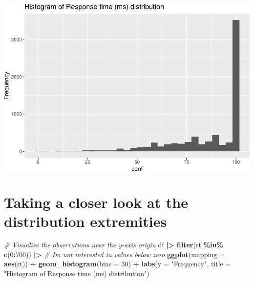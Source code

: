 \documentclass[
]{article}
\newenvironment{Shaded}{\begin{snugshade}}{\end{snugshade}}
\newcommand{\AttributeTok}[1]{\textcolor[rgb]{0.13,0.29,0.53}{#1}}
\newcommand{\CommentTok}[1]{\textcolor[rgb]{0.56,0.35,0.01}{\textit{#1}}}
\newcommand{\DecValTok}[1]{\textcolor[rgb]{0.00,0.00,0.81}{#1}}
\newcommand{\FunctionTok}[1]{\textcolor[rgb]{0.13,0.29,0.53}{\textbf{#1}}}
\newcommand{\NormalTok}[1]{#1}
\newcommand{\SpecialCharTok}[1]{\textcolor[rgb]{0.81,0.36,0.00}{\textbf{#1}}}
\newcommand{\StringTok}[1]{\textcolor[rgb]{0.31,0.60,0.02}{#1}}
\begin{document}
\includegraphics{T5_Data_wrangling_pdf_files/figure-latex/unnamed-chunk-8-1.pdf}

\hypertarget{taking-a-closer-look-at-the-distribution-extremities}{%
\section{Taking a closer look at the distribution
extremities}\label{taking-a-closer-look-at-the-distribution-extremities}}

\begin{Shaded}
\begin{Highlighting}[]
\CommentTok{\# Visualise the observations near the y{-}axis origin}
\NormalTok{df }\SpecialCharTok{|\textgreater{}}
  \FunctionTok{filter}\NormalTok{(rt }\SpecialCharTok{\%in\%} \FunctionTok{c}\NormalTok{(}\DecValTok{0}\SpecialCharTok{:}\DecValTok{700}\NormalTok{)) }\SpecialCharTok{|\textgreater{}} \CommentTok{\# I\textquotesingle{}m not interested in values below zero}
  \FunctionTok{ggplot}\NormalTok{(}\AttributeTok{mapping =} \FunctionTok{aes}\NormalTok{(rt)) }\SpecialCharTok{+}
  \FunctionTok{geom\_histogram}\NormalTok{(}\AttributeTok{bins =} \DecValTok{30}\NormalTok{) }\SpecialCharTok{+} 
  \FunctionTok{labs}\NormalTok{(}\AttributeTok{y =} \StringTok{"Frequency"}\NormalTok{,}
       \AttributeTok{title =} \StringTok{"Histogram of Response time (ms) distribution"}\NormalTok{)}
\end{Highlighting}
\end{Shaded}
\end{document}
